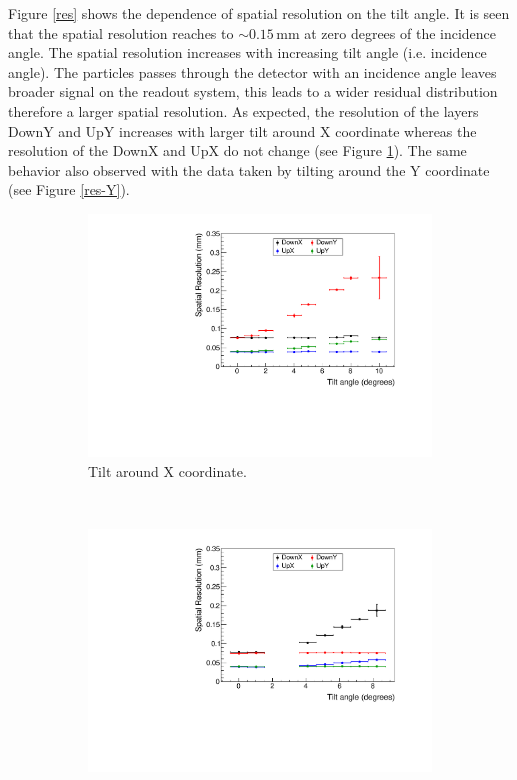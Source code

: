 \documentclass[a4paper,11pt]{article}
\newcommand{\myunit}[1]{$\, \mathrm{#1}$}
\begin{document}
Figure \ref{res} shows the dependence of spatial resolution on the tilt angle. It is seen that the spatial resolution reaches to $\sim 0.15$\myunit{mm} at zero degrees of the incidence angle. The spatial resolution increases with increasing tilt angle (i.e. incidence angle). The particles passes through the detector with an incidence angle leaves broader signal on the readout system, this leads to a wider residual distribution therefore a larger spatial resolution. As expected, the resolution of the layers DownY and UpY increases with larger tilt around X coordinate whereas the resolution of the DownX and UpX do not change (see Figure \ref{res-X}). The same behavior also observed with the data taken by tilting around the Y coordinate (see Figure \ref{res-Y}). 


\begin{figure}[h!]
        \centering
         \begin{subfigure}[t]{0.45\textwidth}
   	\includegraphics[keepaspectratio=true, width=\textwidth]{Figures/mgr_res_tiltX.pdf}
	\caption{Tilt around X coordinate.}
	\label{res-X}
        \end{subfigure}
         ~
         \begin{subfigure}[t]{0.45\textwidth}
        \centering
   	\includegraphics[keepaspectratio=true, width=\textwidth]{Figures/mgr_res_tiltY.pdf}

\end{subfigure}
\end{figure}
\end{document}
